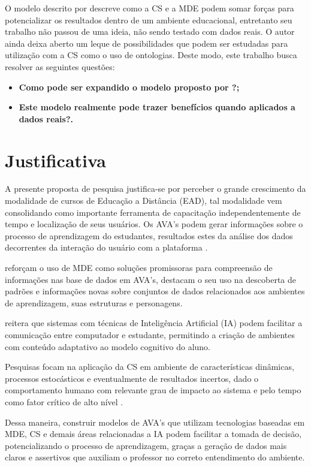\documentclass[
	oneside,
	12pt,				%
	a4paper,			%
	english,			%
	brazil,				%
	article
	]{abntex2}
\begin{document}
O modelo descrito por  descreve como a CS e a MDE podem somar forças para potencializar os resultados dentro de um ambiente educacional, entretanto seu trabalho não passou de uma ideia, não sendo testado com dados reais. O autor ainda deixa aberto um leque de possibilidades que podem ser estudadas para utilização com a CS como o uso de ontologias. Deste modo, este trabalho busca resolver as seguintes questões:

\begin{itemize}	
	\item \textbf{Como pode ser expandido o modelo proposto por ?;}
	\item \textbf{Este modelo realmente pode trazer benefícios quando aplicados a dados reais?.}	 
\end{itemize}

\section{Justificativa}

A presente proposta de pesquisa justifica-se por perceber o grande crescimento da modalidade de cursos de Educação a Distância (EAD), tal modalidade vem consolidando como importante ferramenta de capacitação independentemente de tempo e localização de seus usuários. Os AVA's podem gerar informações sobre o processo de aprendizagem do estudantes, resultados estes da análise dos dados decorrentes da interação do usuário com a plataforma \cite{Fernandes2017}.

 reforçam o uso de MDE como soluções promissoras para compreensão de informações nas base de dados em AVA’s, \cite{Rabelo_et_al2017} destacam o seu uso na descoberta de padrões e informações novas sobre conjuntos de dados relacionados aos ambientes de aprendizagem, suas estruturas e personagens.

 reitera que sistemas com técnicas de Inteligência Artificial (IA) podem facilitar a comunicação entre computador e estudante, permitindo a criação de ambientes com conteúdo adaptativo ao modelo cognitivo do aluno. 

Pesquisas focam na aplicação da CS em ambiente de características dinâmicas, processos estocásticos e eventualmente de resultados incertos, dado o comportamento humano com relevante grau de impacto ao sistema e pelo tempo como fator crítico de alto nível \cite{Berti2017}.

Dessa maneira, construir modelos de AVA's que utilizam tecnologias baseadas em MDE, CS e demais áreas relacionadas  a IA podem facilitar a tomada de decisão, potencializando o processo de aprendizagem, graças a geração de dados mais claros e assertivos que auxiliam o professor no correto entendimento do ambiente.
\end{document}
